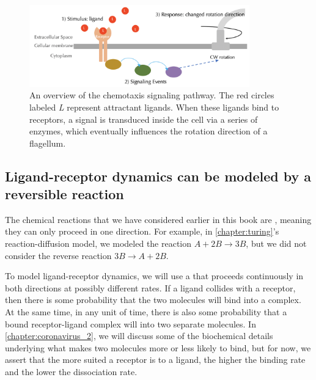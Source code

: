 \begin{figure}[h]
\centering
\mySfFamily
\includegraphics[width = 0.85\textwidth]{../images/chemotaxis_signal.png}
\caption{An overview of the chemotaxis signaling pathway. The red circles labeled \textit{L} represent attractant ligands. When these ligands bind to receptors, a signal is transduced inside the cell via a series of enzymes, which eventually influences the rotation direction of a flagellum.}
\label{fig:chemotaxis_signal}
\end{figure}

\FloatBarrier
\nopagebreak
{}
\subsection{Ligand-receptor dynamics can be modeled by a reversible reaction}

The chemical reactions that we have considered earlier in this book are , meaning they can only proceed in one direction. For example, in \autoref{chapter:turing}'s reaction-diffusion model, we modeled the reaction $A + 2B \rightarrow 3B$, but we did not consider the reverse reaction $3B \rightarrow A + 2B$.

To model ligand-receptor dynamics, we will use a  that proceeds continuously in both directions at possibly different rates. If a ligand collides with a receptor, then there is some probability that the two molecules will bind into a complex. At the same time, in any unit of time, there is also some probability that a bound receptor-ligand complex will  into two separate molecules. In \autoref{chapter:coronavirus_2}, we will discuss some of the biochemical details underlying what makes two molecules more or less likely to bind, but for now, we assert that the more suited a receptor is to a ligand, the higher the binding rate and the lower the dissociation rate.\\

